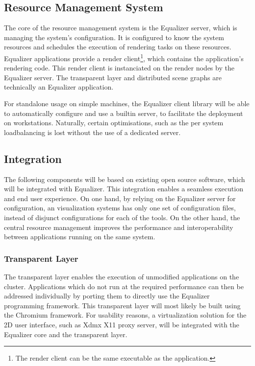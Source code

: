 \documentclass[10pt,a4paper]{scrartcl}
\begin{document}
\subsection{Resource Management System}

The core of the resource management system is the Equalizer server,
which is managing the system's configuration. It is configured to know the
system resources and schedules the execution of rendering tasks on these
resources. Equalizer applications provide a render client\footnote{The
  render client can be the same executable as the application.}, which
contains the application's rendering code. This render client is
instanciated on the render nodes by the Equalizer server. The
transparent layer and distributed scene graphs are technically an
Equalizer application. 

For standalone usage on simple machines, the Equalizer client library
will be able to automatically configure and use a builtin server, to
facilitate the deployment on workstations. Naturally, certain
optimisations, such as the per system loadbalancing is lost without the
use of a dedicated server.

\subsection{Integration}
The following components will be based on existing open source software, which
will be integrated with Equalizer. This integration enables a seamless
execution and end user experience. On one hand, by relying on the
Equalizer server for configuration, an visualization systems has only
one set of configuration files, instead of disjunct configurations for
each of the tools. On the other hand, the central resource management improves
the performance and interoperability between applications running on
the same system.

\subsubsection{Transparent Layer}
The transparent layer enables the execution of unmodified applications
on the cluster. Applications which do not run at the required
performance can then be addressed individually by porting them to
directly use the Equalizer programming framework. This transparent layer
will most likely be built using the Chromium\cite{Humphreys02}
framework. For usability reasons, a virtualization solution for the 2D
user interface, such as Xdmx X11 proxy server, will be integrated with
the Equalizer core and the transparent layer.
\end{document}
